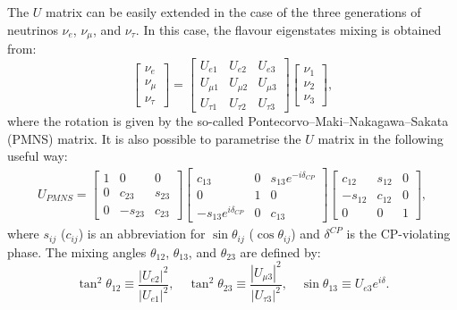 The $U$ matrix can be easily extended in the case of the three generations of neutrinos $\nu_{e}$, $\nu_{\mu}$, and $\nu_{\tau}$. In this case, the flavour eigenstates mixing is obtained from:
\begin{equation}
\begin{bmatrix}
\nu_{e}\\
\nu_{\mu}\\
\nu_{\tau}
\end{bmatrix}=
\begin{bmatrix} U_{e 1} & U_{e 2} & U_{e 3} \\ U_{\mu 1} & U_{\mu 2} & U_{\mu 3} \\ U_{\tau 1} & U_{\tau 2} & U_{\tau 3} 
\end{bmatrix} 
\begin{bmatrix} \nu_1 \\ \nu_2 \\ \nu_3 \end{bmatrix},
\end{equation}
where the rotation is given by the so-called Pontecorvo–Maki–Nakagawa–Sakata (PMNS) matrix. It is also possible to parametrise the $U$ matrix in the following useful way:
\begin{align} 
  U_{PMNS} = \begin{bmatrix} 1 & 0 & 0 \\ 0 & c_{23} & s_{23} \\ 0 & -s_{23} & c_{23} \end{bmatrix}
 \begin{bmatrix} c_{13} & 0 & s_{13}e^{-i\delta_{CP}} \\ 0 & 1 & 0 \\ -s_{13}e^{i\delta_{CP}} & 0 & c_{13} \end{bmatrix}
 \begin{bmatrix} c_{12} & s_{12} & 0 \\ -s_{12} & c_{12} & 0 \\ 0 & 0 & 1 \end{bmatrix},\label{eq:pmns}
\end{align}
where  $s_{ij}$ ($c_{ij}$) is an abbreviation for $\sin\theta_{ij}$ ($\cos\theta_{ij}$) and $\delta^{CP}$ is the CP-violating phase. The mixing angles $\theta_{12}$, $\theta_{13}$, and $\theta_{23}$ are defined by:
\begin{equation}
    \tan^2\theta_{12}\equiv\frac{|U_{e2}|^2}{|U_{e1}|^2},\quad
    \tan^2\theta_{23}\equiv\frac{|U_{\mu3}|^2}{|U_{\tau3}|^2},\quad
    \sin\theta_{13}\equiv U_{e3}e^{i\delta}.
\end{equation}

